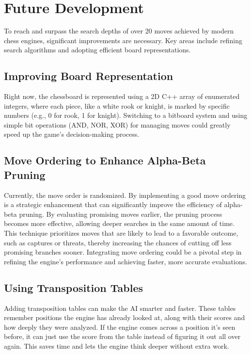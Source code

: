 \documentclass{article}
\begin{document}
\section{Future Development}

To reach and surpass the search depths of over 20 moves achieved by modern chess engines, significant improvements are necessary. Key areas include refining search algorithms and adopting efficient board representations.

\subsection{Improving Board Representation}

Right now, the chessboard is represented using a 2D C++ array of enumerated integers, where each piece, like a white rook or knight, is marked by specific numbers (e.g., 0 for rook, 1 for knight). Switching to a bitboard system and using simple bit operations (AND, NOR, XOR) for managing moves could greatly speed up the game's decision-making process.

\subsection{Move Ordering to Enhance Alpha-Beta Pruning}

Currently, the move order is randomized. By implementing a good move ordering is a strategic enhancement that can significantly improve the efficiency of alpha-beta pruning. By evaluating promising moves earlier, the pruning process becomes more effective, allowing deeper searches in the same amount of time. This technique prioritizes moves that are likely to lead to a favorable outcome, such as captures or threats, thereby increasing the chances of cutting off less promising branches sooner. Integrating move ordering could be a pivotal step in refining the engine's performance and achieving faster, more accurate evaluations.

\subsection{Using Transposition Tables}
Adding transposition tables can make the AI smarter and faster. These tables remember positions the engine has already looked at, along with their scores and how deeply they were analyzed. If the engine comes across a position it's seen before, it can just use the score from the table instead of figuring it out all over again. This saves time and lets the engine think deeper without extra work.
\end{document}

